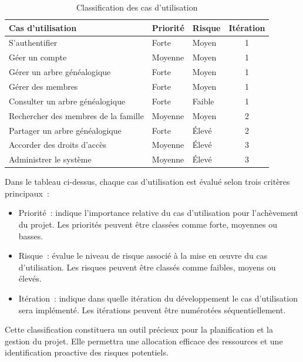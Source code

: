 \begin{table}[H]
  \centering
  \begin{tabular}{|l|l|l|c|}
    \hline
    \textbf{Cas d'utilisation} & \textbf{Priorité} & \textbf{Risque} & \textbf{Itération} \\ \hline
    S'authentifier & Forte & Moyen & 1 \\ \hline
    Géer un compte & Moyenne & Moyen & 1 \\ \hline
    Gérer un arbre généalogique & Forte & Moyen & 1 \\ \hline
    Gérer des membres & Forte & Moyen & 1 \\ \hline
    Consulter un arbre généalogique & Forte & Faible & 1 \\ \hline
    Rechercher des membres de la famille & Moyenne & Moyen & 2 \\ \hline
    Partager un arbre généalogique & Forte & Élevé & 2 \\ \hline
    Accorder des droits d’accès  & Moyenne & Élevé & 3 \\ \hline
    Administrer le système & Moyenne & Élevé & 3 \\ \hline
  \end{tabular}
  \caption{Classification des cas d'utilisation}
\end{table}


Dans le tableau ci-dessus, chaque cas d’utilisation est évalué selon trois critères principaux :

\begin{itemize}

  \item Priorité : indique l’importance relative du cas d’utilisation pour
    l’achèvement du projet. Les priorités peuvent être classées comme forte, moyennes ou basses.

  \item Risque : évalue le niveau de risque associé à la mise en œuvre du cas
    d’utilisation. Les risques peuvent être classés comme faibles, moyens ou élevés.

  \item Itération : indique dans quelle itération du développement le cas
    d’utilisation sera implémenté. Les itérations peuvent être numérotées séquentiellement.

\end{itemize}

Cette classification constituera un outil précieux pour la planification et la
gestion du projet. Elle permettra une allocation efficace des ressources et
une identification proactive des risques potentiels.

